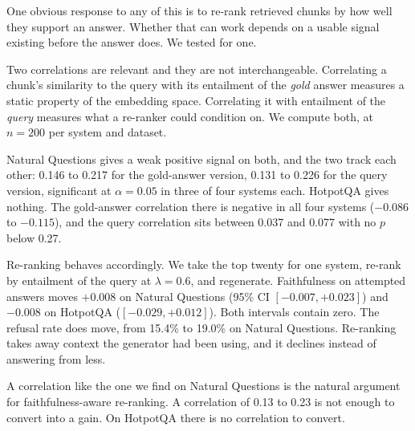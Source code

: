 \label{sec:esa}

One obvious response to any of this is to re-rank retrieved chunks by how well they support an answer. Whether that can work depends on a usable signal existing before the answer does. We tested for one.

Two correlations are relevant and they are not interchangeable. Correlating a chunk's similarity to the query with its entailment of the \emph{gold} answer measures a static property of the embedding space. Correlating it with entailment of the \emph{query} measures what a re-ranker could condition on. We compute both, at $n = 200$ per system and dataset.

Natural Questions gives a weak positive signal on both, and the two track each other: 0.146 to 0.217 for the gold-answer version, 0.131 to 0.226 for the query version, significant at $\alpha = 0.05$ in three of four systems each. HotpotQA gives nothing. The gold-answer correlation there is negative in all four systems ($-0.086$ to $-0.115$), and the query correlation sits between 0.037 and 0.077 with no $p$ below 0.27.

Re-ranking behaves accordingly. We take the top twenty for one system, re-rank by entailment of the query at $\lambda = 0.6$, and regenerate. Faithfulness on attempted answers moves $+0.008$ on Natural Questions (95\% CI $[-0.007, +0.023]$) and $-0.008$ on HotpotQA ($[-0.029, +0.012]$). Both intervals contain zero. The refusal rate does move, from 15.4\% to 19.0\% on Natural Questions. Re-ranking takes away context the generator had been using, and it declines instead of answering from less.

A correlation like the one we find on Natural Questions is the natural argument for faithfulness-aware re-ranking. A correlation of 0.13 to 0.23 is not enough to convert into a gain. On HotpotQA there is no correlation to convert.
